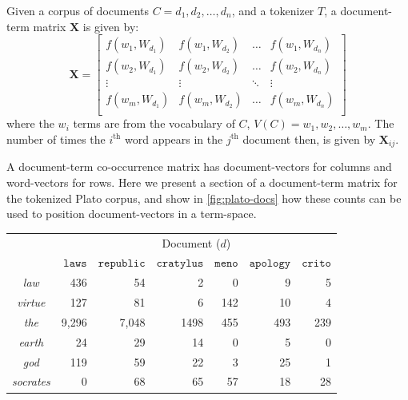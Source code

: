 \begin{definition}
  Given a corpus of documents $C=d_1,d_2,\dots,d_n$, and a tokenizer $T$, a document-term matrix $\bm{X}$ is given by:
  \begin{equation}
    \bm{X}=
  \begin{bmatrix}
    f(w_1, W_{d_1}) & f(w_1, W_{d_2}) & \dots  & f(w_1, W_{d_n}) \\
    f(w_2, W_{d_1}) & f(w_2, W_{d_2}) & \dots  & f(w_2, W_{d_n}) \\
    \vdots        & \vdots        & \ddots & \vdots          \\
    f(w_m, W_{d_1}) & f(w_m, W_{d_2}) & \dots  & f(w_m, W_{d_n}) \\
  \end{bmatrix}
  \end{equation}
  where the $w_i$ terms are from the vocabulary of $C$, $V(C)=w_1,w_2,\dots,w_m$.
  The number of times the $i^{\text{th}}$ word appears in the $j^{\text{th}}$ document then, is given by $\bm{X}_{ij}$.
\end{definition}
\vspace{3em}
\begin{example}
  A document-term co-occurrence matrix has document-vectors for columns and word-vectors for rows. Here we present a section of a document-term matrix for the tokenized Plato corpus, and show in \autoref{fig:plato-docs} how these counts can be used to position document-vectors in a term-space.
  \begin{center}
  \captionsetup{width=.91\linewidth}
    \begin{tabular}{c r r r r r r}
      \toprule
      {\multicolumn{1}{c}{\raisebox{-11pt}{Term}}$\quad$} &
      \multicolumn{6}{c}{Document ($d$)} \\

      \cmidrule(lr){2-7}
      &
      $\texttt{laws}$ &
      $\texttt{republic}$ &
      $\texttt{cratylus}$ &
      $\texttt{meno}$ &
      $\texttt{apology}$ &
      $\texttt{crito}$ \\
      \midrule
      \emph{law}      & 436   & 54    & 2    & 0   & 9   & 5\\
      \emph{virtue}   & 127   & 81    & 6    & 142 & 10  & 4\\
      \emph{the}      & 9,296 & 7,048 & 1498 & 455 & 493 & 239\\
      \emph{earth}    & 24    & 29    & 14   & 0   & 5   & 0\\
      \emph{god}      & 119   & 59    & 22   & 3   & 25  & 1\\
      \emph{socrates} & 0     & 68    & 65   & 57  & 18  & 28\\
      \bottomrule
    \end{tabular}
    \label{tab:plato-doc-term}
    \end{center}
\end{example}
